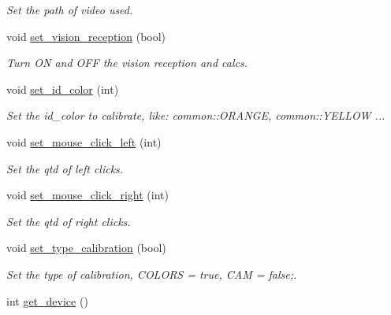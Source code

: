 \begin{DoxyCompactItemize}
\begin{DoxyCompactList}\small\item\em Set the path of video used. \end{DoxyCompactList}\item 
void \hyperlink{classcalibration_a5a1d0ee04511fc9a61767d3bb3f4e357}{set\+\_\+vision\+\_\+reception} (bool)
\begin{DoxyCompactList}\small\item\em Turn ON and O\+FF the vision reception and calcs. \end{DoxyCompactList}\item 
void \hyperlink{classcalibration_a6e2c50598a4f5d49c6d7bda23b69ddf3}{set\+\_\+id\+\_\+color} (int)\hypertarget{classcalibration_a6e2c50598a4f5d49c6d7bda23b69ddf3}{}\label{classcalibration_a6e2c50598a4f5d49c6d7bda23b69ddf3}

\begin{DoxyCompactList}\small\item\em Set the id\+\_\+color to calibrate, like\+: common\+::\+O\+R\+A\+N\+GE, common\+::\+Y\+E\+L\+L\+OW ... \end{DoxyCompactList}\item 
void \hyperlink{classcalibration_aaaf40baef708cb370c468ea0799ffaf6}{set\+\_\+mouse\+\_\+click\+\_\+left} (int)\hypertarget{classcalibration_aaaf40baef708cb370c468ea0799ffaf6}{}\label{classcalibration_aaaf40baef708cb370c468ea0799ffaf6}

\begin{DoxyCompactList}\small\item\em Set the qtd of left clicks. \end{DoxyCompactList}\item 
void \hyperlink{classcalibration_a788f9207f8641b1c3d3a74760e636bb3}{set\+\_\+mouse\+\_\+click\+\_\+right} (int)\hypertarget{classcalibration_a788f9207f8641b1c3d3a74760e636bb3}{}\label{classcalibration_a788f9207f8641b1c3d3a74760e636bb3}

\begin{DoxyCompactList}\small\item\em Set the qtd of right clicks. \end{DoxyCompactList}\item 
void \hyperlink{classcalibration_a7338523745caefc4ce7c156b5c52108f}{set\+\_\+type\+\_\+calibration} (bool)\hypertarget{classcalibration_a7338523745caefc4ce7c156b5c52108f}{}\label{classcalibration_a7338523745caefc4ce7c156b5c52108f}

\begin{DoxyCompactList}\small\item\em Set the type of calibration, C\+O\+L\+O\+RS = true, C\+AM = false;. \end{DoxyCompactList}\item 
int \hyperlink{classcalibration_a4c62df2cfea03276dde05134fd234b2c}{get\+\_\+device} ()\hypertarget{classcalibration_a4c62df2cfea03276dde05134fd234b2c}{}\label{classcalibration_a4c62df2cfea03276dde05134fd234b2c}


\end{DoxyCompactItemize}
